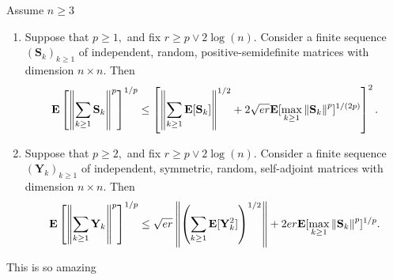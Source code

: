 \begin{ftheorem}
  Assume $n\ge 3$
  \begin{enumerate}[label={(\roman*)}]
    \item
  Suppose that
  $
    p \ge 1
    ,
  $
  and fix
  $
    r
    \ge
    p
    \lor
    2\log(n)
    .
  $
  Consider a finite sequence
  $
    (\mathbf{S}_k)_{k\ge 1}
  $
  of independent, random, positive-semidefinite matrices 
  with dimension 
  $
    n\times n.
  $
  Then
  \begin{gather}
      \mathbf{E}
      \left[
        \left\lVert
          \sum_{k\ge 1}
            \mathbf{S}_k
        \right\rVert
        ^{p}
      \right]
      ^{1/p}
      \le
      \left[ 
        \left\lVert
          \sum_{k\ge 1}
          \mathbf{E}
          [
            \mathbf{S}_k
          ]
        \right\rVert^{1/2}
        +
        2
        \sqrt{e r}
        \mathbf{E}
        [
          \max_{k\ge 1}
          \left\lVert
            \mathbf{S}_k
          \right\rVert
          ^p
        ]
        ^{1/(2p)}
      \right]
      ^2
      .
  \end{gather}
    \item
  Suppose that
  $
    p \ge 2
    ,
  $
  and fix
  $
    r
    \ge
    p
    \lor
    2\log(n)
    .
  $
  Consider a finite sequence
  $
    (\mathbf{Y}_k)_{k\ge 1}
  $
  of independent, symmetric, random, self-adjoint matrices 
  with dimension 
  $
    n\times n.
  $
  Then
  \begin{gather}
      \mathbf{E}
      \left[
        \left\lVert
          \sum_{k\ge 1}
            \mathbf{Y}_k
        \right\rVert
        ^{p}
      \right]
      ^{1/p}
      \le
        \sqrt{e r}
        \left\lVert
          \left( 
          \sum_{k\ge 1}
          \mathbf{E}
          [
            \mathbf{Y}_k^2
          ]
          \right)
          ^{1/2}
        \right\rVert
        +
        2
        er
        \mathbf{E}
        [
          \max_{k\ge 1}
          \left\lVert
            \mathbf{S}_k
          \right\rVert
          ^p
        ]
        ^{1/p}
      .
  \end{gather}

  \end{enumerate}
\end{ftheorem}
\begin{takeaways}
  This is so amazing
  \lipsum[2]
\end{takeaways}
